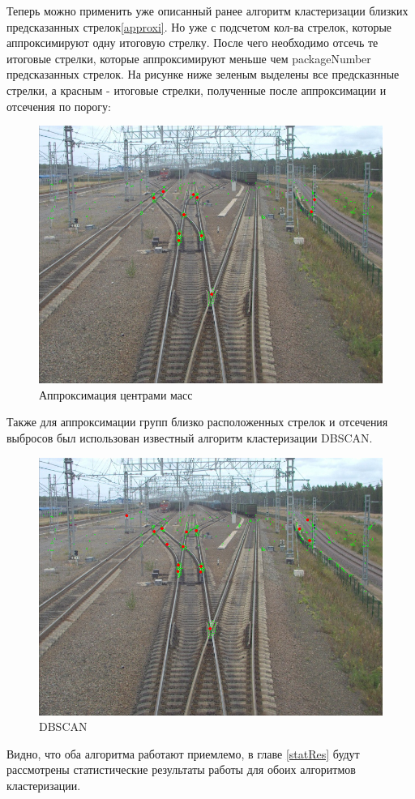Теперь можно применить уже описанный ранее алгоритм кластеризации близких предсказанных стрелок\ref{approxi}. Но уже с подсчетом кол-ва стрелок, которые аппроксимируют одну итоговую стрелку. После чего необходимо отсечь те итоговые стрелки, которые аппроксимируют меньше чем packageNumber предсказанных стрелок. На рисунке ниже зеленым выделены все предсказнные стрелки, а красным - итоговые стрелки, полученные после аппроксимации и отсечения по порогу:
\begin{figure}[h!]
	\centering
	\includegraphics[width=0.7\linewidth]{pictures/package1}
	\caption{Аппроксимация центрами масс}
	\label{fig:package1}
\end{figure}
\newpage
Также для аппроксимации групп близко расположенных стрелок и отсечения выбросов был использован известный алгоритм кластеризации DBSCAN\cite{b:dbscan}. 
\begin{figure}[h!]
	\centering
	\includegraphics[width=0.7\linewidth]{pictures/dbscan}
	\caption{DBSCAN}
	\label{fig:package1}
\end{figure}

Видно, что оба алгоритма работают приемлемо, в главе \ref{statRes} будут рассмотрены статистические результаты работы для обоих алгоритмов кластеризации.
\newpage

